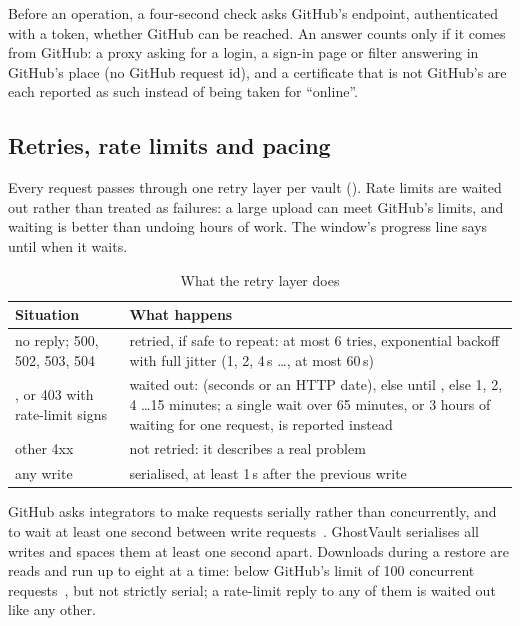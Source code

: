 Before an operation, a four-second check asks GitHub's  endpoint, authenticated
with a token, whether GitHub can be reached. An answer counts only if it comes from GitHub: a proxy
asking for a login, a sign-in page or filter answering in GitHub's place (no GitHub request id), and
a certificate that is not GitHub's are each reported as such instead of being taken for ``online''.

\subsection{Retries, rate limits and pacing}
Every request passes through one retry layer per vault (). Rate limits are
waited out rather than treated as failures: a large upload can meet GitHub's limits, and waiting is
better than undoing hours of work. The window's progress line says until when it waits.

\begin{table}[t]
\caption{What the retry layer does}\label{tab:retries}
\centering\footnotesize
\begin{tabular}{@{}L{24mm}L{56mm}@{}}
\toprule
\textbf{Situation} & \textbf{What happens} \\
\midrule
no reply; 500, 502, 503, 504 & retried, if safe to repeat: at most 6 tries, exponential backoff with
full jitter (1, 2, 4\,s \dots, at most 60\,s) \\ , or 403 with rate-limit signs & waited out:  (seconds or an HTTP date), else
until , else 1, 2, 4 \dots 15 minutes; a single wait over 65 minutes, or
3 hours of waiting for one request, is reported instead \\ \addlinespace[1.6pt]
other 4xx & not retried: it describes a real problem \\ \addlinespace[1.6pt]
any write & serialised, at least 1\,s after the previous write \\
\bottomrule
\end{tabular}
\end{table}

GitHub asks integrators to make requests serially rather than concurrently, and to wait at least one
second between write requests~\cite{gh-best}. GhostVault serialises all writes and spaces them at
least one second apart. Downloads during a restore are reads and run up to eight at a time: below
GitHub's limit of 100 concurrent requests~\cite{gh-rate}, but not strictly serial; a rate-limit reply
to any of them is waited out like any other.

